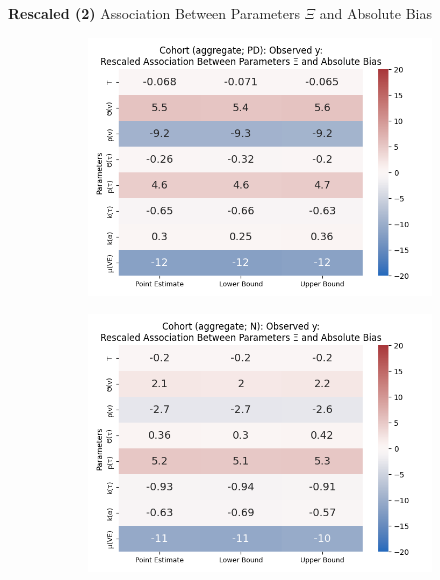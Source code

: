 \documentclass[aspectratio=169]{beamer}
\begin{document}
\begin{frame}{\textbf{Rescaled (2)} Association Between Parameters $\Xi$ and Absolute Bias}
\begin{figure}[H]
\begin{subfigure}[t]{0.23\linewidth}
		\end{subfigure}
		\begin{subfigure}[t]{0.23\linewidth}
			\centering
			\includegraphics[scale=0.25]{VEMethod_Drivers1b_FEest_Realistic2_Li_MSpec_Heatmap7.png}
		\end{subfigure}
		\begin{subfigure}[t]{0.23\linewidth}
			\centering
			\includegraphics[scale=0.25]{VEMethod_Drivers1b_FEest_Realistic2_Li_MSpec_Heatmap8.png}
		\end{subfigure}
		

\end{figure}
\end{frame}
\end{document}
